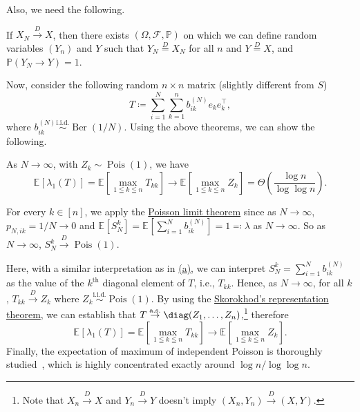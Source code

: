 \begin{answer}
\begin{enumerate}[(a)]
		      Also, we need the following.

		      \begin{theorem}\label{thm:Skorokhod-representation}
			      If \(X_N \overset{D}{\to} X\), then there exists \((\Omega , \mathscr{F} , \mathbb{P} )\) on which we can define random variables \((Y_n)\) and \(Y\) such that \(Y_N \overset{D}{=} X_N\) for all \(n\) and \(Y \overset{D}{=} X\), and \(\mathbb{P} (Y_N \to Y) = 1\).
		      \end{theorem}

		      Now, consider the following random \(n \times n\) matrix (slightly different from \(S\))
		      \[
			      T \coloneqq \sum_{i=1}^{N} \sum_{k=1}^{n} b_{ik}^{(N)} e_k e_k ^{\top} ,
		      \]
		      where \(b_{ik}^{(N)} \overset{\text{i.i.d.} }{\sim } \operatorname{Ber}(1 / N) \). Using the above theorems, we can show the following.

		      \begin{claim}
			      As \(N \to \infty \), with \(Z_k \sim \operatorname{Pois}(1) \), we have
			      \[
				      \mathbb{E}_{}[\lambda _1(T)]
				      = \mathbb{E}_{}\left[ \max _{1 \leqq k \leqq n} T_{k k} \right]
				      \to \mathbb{E}_{}\left[ \max _{1 \leqq k \leqq n} Z_k \right]
				      = \Theta \left( \frac{\log n}{\log \log n} \right).
			      \]
		      \end{claim}
		      \begin{explanation}
			      For every \(k \in [n]\), we apply the \hyperref[thm:Poisson-limit]{Poisson limit theorem} since as \(N \to \infty \), \(p_{N, ik} = 1 / N \to 0\) and \(\mathbb{E}_{}[S^k_N] = \mathbb{E}_{}[\sum_{i=1}^{N} b^{(N)}_{ik}] = 1 \eqqcolon \lambda \) as \(N \to \infty \). So as \(N \to \infty \), \(S^k_N \overset{D}{\to} \operatorname{Pois}(1) \).

			      Here, with a similar interpretation as in \hyperref[ex5.4.14:a]{(a)}, we can interpret \(S^k_N = \sum_{i=1}^{N} b^{(N)}_{ik}\) as the value of the \(k^{\text{th} }\) diagonal element of \(T\), i.e., \(T_{k k}\). Hence, as \(N \to \infty \), for all \(k\), \(T_{k k} \overset{D}{\to} Z_k\) where \(Z_k \overset{\text{i.i.d.} }{\sim } \operatorname{Pois}(1) \). By using the \hyperref[thm:Skorokhod-representation]{Skorokhod's representation theorem}, we can establish that \(T \overset{\text{a.s.} }{\to} \diag (Z_1, \dots , Z_n)\),\footnote{Note that \(X_n \overset{D}{\to} X\) and \(Y_n \overset{D}{\to} Y\) doesn't imply \((X_n, Y_n) \overset{D}{\to} (X, Y)\).} therefore
			      \[
				      \mathbb{E}_{}[\lambda _1 (T)]
				      = \mathbb{E}_{}\left[\max _{1 \leqq k \leqq n} T_{k k}\right]
				      \to \mathbb{E}_{}\left[\max _{1 \leqq k \leqq n} Z_k \right].
			      \]
			      Finally, the expectation of maximum of independent Poisson is thoroughly studied~\cite{kimber1983note,briggs2009notedistributionmaximumset}, which is highly concentrated exactly around \(\log n / \log \log n\).
		      \end{explanation}


\end{enumerate}
\end{answer}
